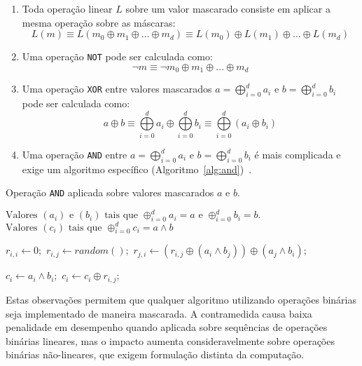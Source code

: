 \begin{enumerate}
        \item Toda operação linear $L$ sobre um valor mascarado consiste em aplicar a mesma operação sobre as máscaras:
        $$L(m) \equiv L(m_0 \oplus m_1 \oplus \ldots \oplus m_d) \equiv L(m_0)  \oplus L(m_1) \oplus \ldots \oplus L(m_d)$$
        \item Uma operação \texttt{NOT} pode ser calculada como:
        $$\neg m \equiv \neg m_0 \oplus m_1 \oplus \ldots \oplus m_d$$
        \item Uma operação \texttt{XOR} entre valores mascarados $a =  \bigoplus\limits_{i=0}^{d}a_i$ e $b =  \bigoplus\limits_{i=0}^{d}b_i$ pode ser calculada como:
        $$ a \oplus b \equiv \bigoplus\limits_{i=0}^{d}a_i \oplus \bigoplus\limits_{i=0}^{d}b_i \equiv \bigoplus\limits_{i=0}^{d}(a_i \oplus b_i)$$
        \item Uma operação \texttt{AND} entre $a =  \bigoplus\limits_{i=0}^{d}a_i$ e $b =  \bigoplus\limits_{i=0}^{d}b_i$ é mais complicada e exige um algoritmo específico (Algoritmo~\ref{alg:and})~\cite{IshaiSW03}.
\end{enumerate}

\begin{algorithm}[H]
\caption{Operação \texttt{AND} aplicada sobre valores mascarados $a$ e $b$.}\label{alg:and}
\begin{algorithmic}[1]
        \REQUIRE $\text{Valores }(a_i) \text{ e } (b_i) \text{ tais que } \oplus_{i=0}^da_i = a  \text{ e }  \oplus_{i=0}^db_i = b \text{.} $
        \ENSURE $\text{Valores }(c_i) \text{ tais que } \oplus_{i=0}^dc_i = a \wedge b$
        
                \STATE  $r_{i,i}\gets 0;$
                        \STATE $r_{i,j}\gets random( );$
                        \STATE $r_{j,i}\gets (r_{i,j} \oplus (a_i \wedge b_j)) \oplus (a_j \wedge b_i); $
                \ENDFOR
        \ENDFOR
        
                \STATE  $c_i \gets a_i \wedge b_i;$
                        \STATE $c_i \gets c_i \oplus r_{i,j};$
                \ENDFOR
        \ENDFOR
\end{algorithmic}
\end{algorithm}

Estas observações permitem que qualquer algoritmo utilizando operações binárias seja implementado de maneira mascarada.
A contramedida causa baixa penalidade em desempenho quando aplicada sobre sequências de operações binárias lineares, mas o impacto aumenta consideravelmente sobre operações binárias não-lineares, que exigem formulação distinta da computação.

